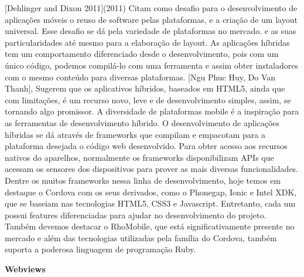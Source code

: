[Dehlinger and Dixon 2011](2011) Citam como desafio para o desenvolvimento de aplicações móveis o reuso de software pelas plataformas, e a criação de um layout universal. Esse desafio se dá pela variedade de plataformas no mercado. e as suas particularidades até mesmo para a elaboração de layout.
As aplicações híbridas tem um comportamento diferenciado desde o desenvolvimento, pois com um único código, podemos compilá-lo com uma ferramenta e assim obter instaladores com o mesmo conteúdo para diversas plataformas. 
[Ngu Phuc Huy, Do Van Thanh], Sugerem que os aplicativos híbridos, baseados em HTML5, ainda que com limitações, é um recurso novo, leve e de desenvolvimento simples, assim, se tornando algo promissor.
A diversidade de plataformas mobile é a inspiração para as ferramentas de desenvolvimento híbrido. O desenvolvimento de aplicações híbridas se dá através de frameworks que compilam e empacotam para a plataforma desejada o código web desenvolvido. Para obter acesso aos recursos nativos do aparelhos, normalmente os frameworks disponibilizam APIs que acessam os sensores dos dispositivos para prover as mais diversas funcionalidades. Dentre os muitos frameworks nessa linha de desenvolvimento, hoje temos em destaque o Cordova com os seus derivados, como o Phonegap, Ionic e Intel XDK, que se baseiam nas tecnologias HTML5, CSS3 e Javascript. Entretanto, cada um possui features diferenciadas para ajudar no desenvolvimento do projeto. Também devemos destacar o RhoMobile, que está significativamente presente no mercado e além das tecnologias utilizadas pela família do Cordova, também suporta a poderosa linguagem de programação Ruby.

\textbf{Webviews}

